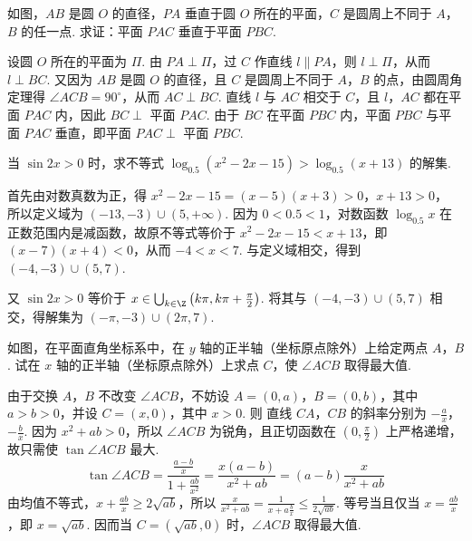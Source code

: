\begin{problem}

如图，\(AB\) 是圆 \(O\) 的直径，\(PA\) 垂直于圆 \(O\) 所在的平面，\(C\) 是圆周上不同于 \(A\)，\(B\) 的任一点. 求证：平面 \(PAC\) 垂直于平面 \(PBC\).

\end{problem}

\begin{solution}
设圆 \(O\) 所在的平面为 \(\Pi\). 由 \(PA\perp\Pi\)，过 \(C\) 作直线 \(l\parallel PA\)，则 \(l\perp\Pi\)，从而 \(l\perp BC\). 又因为 \(AB\) 是圆 \(O\) 的直径，且 \(C\) 是圆周上不同于 \(A\)，\(B\) 的点，由圆周角定理得 \(\angle ACB=90^\circ\)，从而 \(AC\perp BC\). 直线 \(l\) 与 \(AC\) 相交于 \(C\)，且 \(l\)，\(AC\) 都在平面 \(PAC\) 内，因此 \(BC\perp\) 平面 \(PAC\). 由于 \(BC\) 在平面 \(PBC\) 内，平面 \(PBC\) 与平面 \(PAC\) 垂直，即平面 \(PAC\perp\) 平面 \(PBC\).
\end{solution}

\begin{problem}

当 \(\sin 2x > 0\) 时，求不等式 \(\log_{0.5}(x^2 - 2x - 15) > \log_{0.5}(x + 13)\) 的解集.
\end{problem}

\begin{solution}
首先由对数真数为正，得
\(x^2-2x-15=(x-5)(x+3)>0\)，\(x+13>0\)，
所以定义域为 \((-13,-3)\cup(5,+\infty)\). 因为 \(0<0.5<1\)，对数函数 \(\log_{0.5}x\) 在正数范围内是减函数，故原不等式等价于
\(x^2-2x-15<x+13\)，即 \((x-7)(x+4)<0\)，从而 \(-4<x<7\). 与定义域相交，得到 \((-4,-3)\cup(5,7)\).

又 \(\sin 2x>0\) 等价于 \(x\in\bigcup_{k\in\Z}\left(k\pi,k\pi+\frac{\pi}{2}\right)\). 将其与 \((-4,-3)\cup(5,7)\) 相交，得解集为 \((-\pi,-3)\cup(2\pi,7)\).
\end{solution}

\begin{problem}

如图，在平面直角坐标系中，在 \(y\) 轴的正半轴（坐标原点除外）上给定两点 \(A\)，\(B\). 试在 \(x\) 轴的正半轴（坐标原点除外）上求点 \(C\)，使 \(\angle ACB\) 取得最大值.

\end{problem}

\begin{solution}
由于交换 \(A\)，\(B\) 不改变 \(\angle ACB\)，不妨设 \(A=(0,a)\)，\(B=(0,b)\)，其中 \(a>b>0\)，并设 \(C=(x,0)\)，其中 \(x>0\). 则
直线 \(CA\)，\(CB\) 的斜率分别为 \(-\frac{a}{x}\)，\(-\frac{b}{x}\). 因为 \(x^2+ab>0\)，所以 \(\angle ACB\) 为锐角，且正切函数在 \(\left(0,\frac{\pi}{2}\right)\) 上严格递增，故只需使 \(\tan\angle ACB\) 最大.
\[
\tan\angle ACB=\frac{\frac{a-b}{x}}{1+\frac{ab}{x^2}}=\frac{x(a-b)}{x^2+ab}=(a-b)\frac{x}{x^2+ab}
\]
由均值不等式，\(x+\frac{ab}{x}\geq2\sqrt{ab}\)，所以
\(\frac{x}{x^2+ab}=\frac{1}{x+a\frac{b}{x}}\leq\frac{1}{2\sqrt{ab}}\). 等号当且仅当 \(x=\frac{ab}{x}\)，即 \(x=\sqrt{ab}\). 因而当 \(C=(\sqrt{ab},0)\) 时，\(\angle ACB\) 取得最大值.
\end{solution}

